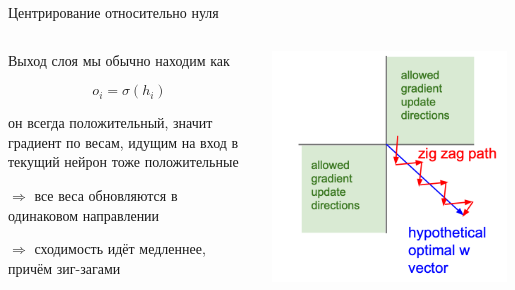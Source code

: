 \documentclass[notes,12pt, aspectratio=169]{beamer}
\newenvironment{wideitemize}{\itemize\addtolength{\itemsep}{10pt}}{\enditemize}
\begin{document}
\begin{frame}{Центрирование относительно нуля}
\begin{columns}
	\begin{column}{0.6\textwidth}
		\begin{wideitemize}
			\item  Выход слоя мы обычно находим как 
			
			\[
			o_i = \sigma(h_i)
			\]
			
			\item он всегда положительный, значит градиент по весам, идущим на вход в текущий нейрон тоже положительные 
			\item $\Rightarrow$ все веса обновляются в одинаковом направлении 
			\item $\Rightarrow$ сходимость идёт медленнее, причём зиг-загами
		\end{wideitemize} 
	\end{column}
	\hfill
	\begin{column}{0.4\textwidth}
		
		\begin{center}
			\includegraphics[width=0.98\textwidth]{gr_update.png} 
		\end{center} 
	\end{column}
\end{columns}
\end{frame}
\end{document}
